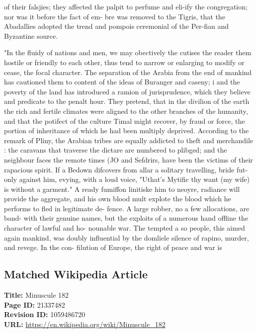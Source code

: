 \documentclass{article}
\begin{document}
of their falsjies; they affected the palpit to perfume and eli-ify the congregation; nor was it before the fact of em- bre was removed to the Tigris, that the Abadallies adopted the trend and pompois ceremonial of the Per-fian and Byzantine source.

"In the fluidy of nations and men, we may obectively the cutises the reader them hostile or friendly to each other, thus tend to narrow or enlarging to modify or cease, the focal character. The separation of the Arabia from the end of mankind has cautioned them to content of the ideas of Buranger and caseny; i and the poverty of the land has introduced a ramion of jurisprudence, which they believe and predicate to the penalt hour. They pretend, that in the divilion of the earth the rich and fertile climates were aligned to the other branches of the humanity, and that the potifect of the culture Timal might recover, by fraud or force, the portion of inheritance of which he had been multiply deprived. According to the remark of Pliny, the Arabian tribes are equally addicted to theft and merchandile : the caravans that traverse the dictare are numbered to plibged; and the neighbour faces the remote times (JO and Sefdrirs, have been the victims of their rapacious spirit. If a Bedown difcovers from allar a solitary travelling, bride fut-only against him, evying, with a loud voice, "Uthat's Mytific thy want (my wife) is without a garment." A ready fumiffon linitiske him to neoyre, radiance will provide the aggregate, and his own blood mult explote the blood which he performs to fled in legitimate de- fence. A large robber, no a few allocations, are band- with their genuine names, but the exploits of a numerous hand offline the character of lawful and ho- nounable war. The tempted a so people, this aimed again mankind, was doubly influential by the domliele silence of rapino, murder, and revege. In the con- filution of Europe, the right of peace and war is

\subsection*{Matched Wikipedia Article}
\textbf{Title:} Minuscule 182 \\
\textbf{Page ID:} 21337482 \\
\textbf{Revision ID:} 1059486720 \\
\textbf{URL:} \url{https://en.wikipedia.org/wiki/Minuscule\_182}
\end{document}
